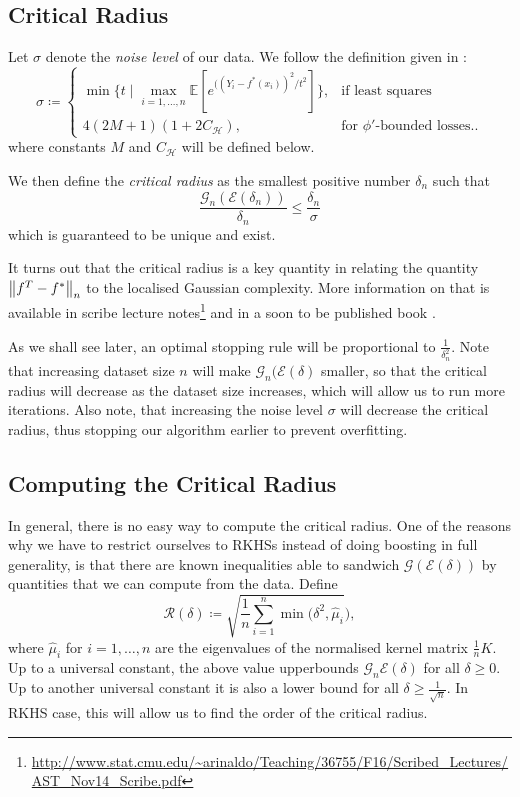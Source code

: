\subsection{Critical Radius}

Let $\sigma$ denote the \textit{noise level} of our data. We follow the definition
given in \cite{wain17ada}:
$$
\sigma \coloneqq
\begin{cases}
  \min\{t \mid \underset{i = 1, \dots, n}{\max} \mathbb{E}[e^{((Y_{i} - f^{*}(x_{i}))^{2}/t^{2}}] \}, & \text{if least squares} \\
  4(2M + 1)(1 + 2C_{\mathcal{H}}), & \text{for } \phi'\text{-bounded losses.}.
\end{cases}
$$
where constants $M$ and $C_{\mathcal{H}}$ will be defined below.

We then define the \textit{critical radius} as the smallest positive number $\delta_{n}$ such that
\begin{equation*}
  \frac{\mathcal{G}_n(\mathcal{E}(\delta_{n}))}{\delta_n} \le \frac{\delta_{n}}{\sigma}
\end{equation*}
which is guaranteed to be unique and exist.

It turns out that the critical radius is a key quantity in relating the quantity
$\left\lVert f^{T} - f^{*}\right\rVert_{n}$ to the localised Gaussian complexity.
More information on that is available in scribe lecture notes\footnote{\url{http://www.stat.cmu.edu/~arinaldo/Teaching/36755/F16/Scribed_Lectures/AST_Nov14_Scribe.pdf}} and in a soon to
be published book \cite{wainwright2017high}.

As we shall see later, an optimal stopping rule will be proportional to $\frac{1}{\delta_{n}^{2}}$.
Note that increasing dataset size $n$ will make $\mathcal{G}_{n}(\mathcal{E}(\delta)$ smaller,
so that the critical radius will decrease as the dataset size increases, which will
allow us to run more iterations. Also note, that increasing the noise level $\sigma$
will decrease the critical radius, thus stopping our algorithm earlier to prevent
overfitting.

\subsection{Computing the Critical Radius}

In general, there is no easy way to compute the critical radius.
One of the reasons why we have to restrict ourselves to RKHSs instead of doing
boosting in full generality, is that there are known inequalities able to sandwich
$\mathcal{G}(\mathcal{E}(\delta))$ by quantities that we can compute from the data.
Define
$$
\mathcal{R}(\delta) \coloneqq \sqrt{\frac{1}{n} \sum_{i=1}^{n} \min(\delta^{2}, \hat{\mu}_{i}}),
$$
where $\hat{\mu}_{i}$ for $i = 1, \dots, n$ are the eigenvalues of the normalised
kernel matrix $\frac{1}{n}K$.
Up to a universal constant, the above value upperbounds $\mathcal{G}_{n}{\mathcal{E}(\delta)}$
for all $\delta \geq 0$. Up to another universal constant it is also a lower bound for all
$\delta \geq \frac{1}{\sqrt{n}}$. In RKHS case, this will allow us to find the order
of the critical radius.


